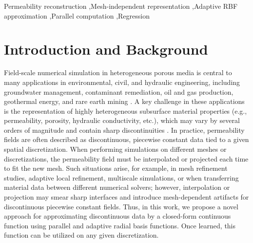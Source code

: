 \documentclass[final,1p,times]{elsarticle}
\theoremstyle{plain}
\theoremstyle{definition}
\theoremstyle{remark}
\begin{document}
\begin{frontmatter}
\begin{abstract}
To enhance computational efficiency, the domain is partitioned into subdomains, and the reconstruction problem is solved independently on each subdomain in parallel.
Numerical experiments demonstrate the accuracy, adaptivity, scalability, and downstream impact of the proposed method on Darcy flow simulations, including tests on heterogeneous permeability fields, mesh-transfer settings, and the SPE10 benchmark.
\end{abstract}




\begin{keyword}
 Permeability reconstruction \sep Mesh-independent representation \sep Adaptive RBF approximation \sep Parallel computation \sep Regression 
\end{keyword}

\end{frontmatter}




\section{Introduction and Background}

Field-scale numerical simulation in heterogeneous porous media is central to many applications in environmental, civil, and hydraulic engineering, including groundwater management, contaminant remediation, oil and gas production, geothermal energy, and rare earth mining \cite{bear1972dynamics,dagan1989flow,durlofsky1991numerical}. A key challenge in these applications is the representation of highly heterogeneous subsurface material properties (e.g., permeability, porosity, hydraulic conductivity, etc.), which may vary by several orders of magnitude and contain sharp discontinuities \cite{hou1997multiscale,efendiev2009multiscale,lee2016pressure,choo2018enriched,lee2026}. In practice, permeability fields are often described as discontinuous, piecewise constant data tied to a given spatial discretization. When performing simulations on different meshes or discretizations, the
permeability field must be interpolated or projected each time to fit the new
mesh. Such situations arise, for example, in mesh refinement studies, adaptive
local refinement, multiscale simulations, or when transferring material data
between different numerical solvers; however, interpolation or projection may
smear sharp interfaces and introduce mesh-dependent artifacts for discontinuous
piecewise constant fields.
Thus, in this work, we propose a novel approach for approximating discontinuous
data by a closed-form continuous function using parallel and adaptive radial
basis functions. Once learned, this function can be utilized on any given
discretization.
\end{document}
